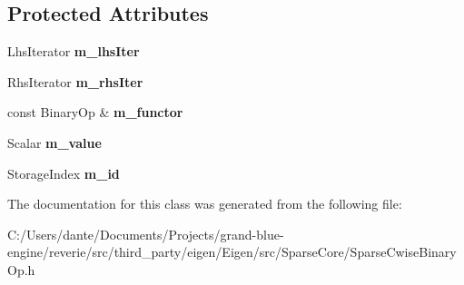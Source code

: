 \subsection*{Protected Attributes}
\begin{DoxyCompactItemize}
\item 
\mbox{\label{class_eigen_1_1internal_1_1binary__evaluator_3_01_cwise_binary_op_3_01_binary_op_00_01_lhs_00_01bbcbab6e07c6c8a44f9c2134b78b5906_a83d42d7f86a02cd0e24334ecf75834ab}} 
Lhs\+Iterator {\bfseries m\+\_\+lhs\+Iter}
\item 
\mbox{\label{class_eigen_1_1internal_1_1binary__evaluator_3_01_cwise_binary_op_3_01_binary_op_00_01_lhs_00_01bbcbab6e07c6c8a44f9c2134b78b5906_a3805f0c861f82e10492da6786cc9a9f2}} 
Rhs\+Iterator {\bfseries m\+\_\+rhs\+Iter}
\item 
\mbox{\label{class_eigen_1_1internal_1_1binary__evaluator_3_01_cwise_binary_op_3_01_binary_op_00_01_lhs_00_01bbcbab6e07c6c8a44f9c2134b78b5906_a48d811ac2282bb7ed6c8da6ecfa6fc0d}} 
const Binary\+Op \& {\bfseries m\+\_\+functor}
\item 
\mbox{\label{class_eigen_1_1internal_1_1binary__evaluator_3_01_cwise_binary_op_3_01_binary_op_00_01_lhs_00_01bbcbab6e07c6c8a44f9c2134b78b5906_a601cf7cc0e140b4fbbfbd7be4367b912}} 
Scalar {\bfseries m\+\_\+value}
\item 
\mbox{\label{class_eigen_1_1internal_1_1binary__evaluator_3_01_cwise_binary_op_3_01_binary_op_00_01_lhs_00_01bbcbab6e07c6c8a44f9c2134b78b5906_a7f7bc057c902eb974576cacaa316f7dd}} 
Storage\+Index {\bfseries m\+\_\+id}
\end{DoxyCompactItemize}


The documentation for this class was generated from the following file\+:\begin{DoxyCompactItemize}
\item 
C\+:/\+Users/dante/\+Documents/\+Projects/grand-\/blue-\/engine/reverie/src/third\+\_\+party/eigen/\+Eigen/src/\+Sparse\+Core/Sparse\+Cwise\+Binary\+Op.\+h\end{DoxyCompactItemize}
